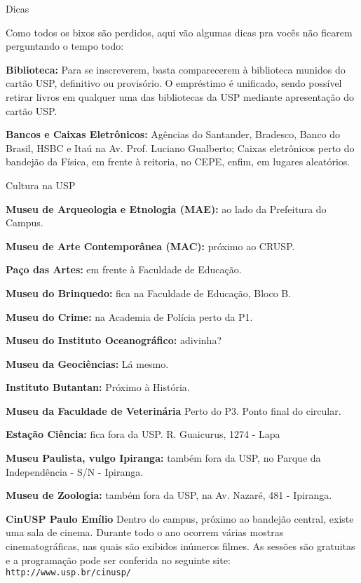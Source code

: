 \begin{secao}{Dicas}

Como todos os bixos são perdidos, aqui vão algumas dicas pra vocês não ficarem perguntando o tempo todo:

{\bf Biblioteca:} Para se inscreverem, basta comparecerem à biblioteca munidos do
cartão USP, definitivo ou provisório. O empréstimo é unificado, sendo possível
retirar livros em qualquer uma das bibliotecas da USP mediante apresentação do
cartão USP. 


{\bf Bancos e Caixas Eletrônicos:} Agências do Santander, Bradesco,
Banco do Brasil, HSBC e Itaú na Av. Prof. Luciano
Gualberto; Caixas eletrônicos perto do bandejão da Física, em frente à reitoria,
no CEPE, enfim, em lugares aleatórios.

\begin{subsecao}{Cultura na USP}

{\bf Museu de Arqueologia e Etnologia (MAE):} ao lado da Prefeitura do Campus.

{\bf Museu de Arte Contemporânea (MAC):} próximo ao CRUSP.

{\bf Paço das Artes:} em frente à Faculdade de Educação.

{\bf Museu do Brinquedo:} fica na Faculdade de Educação, Bloco B.

{\bf Museu do Crime:} na Academia de Polícia perto da P1.

{\bf Museu do Instituto Oceanográfico:} adivinha?

{\bf Museu da Geociências:} Lá mesmo.

{\bf Instituto Butantan:} Próximo à História.

{\bf Museu da Faculdade de Veterinária} Perto do P3. Ponto final do circular.

{\bf Estação Ciência:} fica fora da USP. R. Guaicurus, 1274 - Lapa

{\bf Museu Paulista, vulgo Ipiranga: }também fora da USP, no Parque da
Independência - S/N  - Ipiranga.

{\bf Museu de Zoologia: }também fora da USP, na Av. Nazaré, 481  -
Ipiranga.

{\bf CinUSP Paulo Emílio} Dentro do campus, próximo ao bandejão central, existe uma sala de cinema. Durante todo o ano ocorrem várias mostras cinematográficas, nas quais são exibidos inúmeros filmes. As sessões são gratuitas e a programação pode ser conferida no seguinte site: {\tt http://www.usp.br/cinusp/}



\end{subsecao}
\end{secao}

